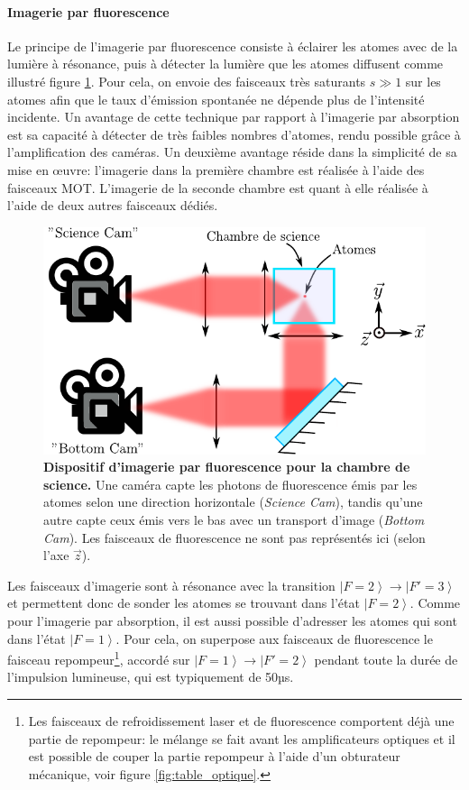 \paragraph*{Imagerie par fluorescence}
Le principe de l'imagerie par fluorescence consiste à éclairer les atomes avec de la lumière à résonance, puis à détecter la lumière que les atomes diffusent comme illustré figure \ref{fig:img_science}. Pour cela, on envoie des faisceaux très saturants $s \gg 1$ sur les atomes afin que le taux d'émission spontanée ne dépende plus de l'intensité incidente. Un avantage de cette technique par rapport à l'imagerie par absorption est sa capacité à détecter de très faibles nombres d'atomes, rendu possible grâce à l'amplification des caméras. Un deuxième avantage réside dans la simplicité de sa mise en œuvre: l'imagerie dans la première chambre est réalisée à l'aide des faisceaux MOT. L'imagerie de la seconde chambre est quant à elle réalisée à l'aide de deux autres faisceaux dédiés.
\begin{figure}
\centering
\includegraphics[scale=1]{fig/BEC_manip/img_science_3.pdf}
\caption{\textbf{Dispositif d'imagerie par fluorescence pour la chambre de science.} Une caméra capte les photons de fluorescence émis par les atomes selon une direction horizontale (\emph{Science Cam}), tandis qu'une autre capte ceux émis vers le bas avec un transport d'image (\emph{Bottom Cam}). Les faisceaux de fluorescence ne sont pas représentés ici (selon l'axe $\vec{z}$).}
\label{fig:img_science}
\end{figure}
Les faisceaux d'imagerie sont à résonance avec la transition $\left| F=2 \right\rangle \rightarrow \left| F'=3 \right\rangle$ et permettent donc de sonder les atomes se trouvant dans l'état $\left| F=2 \right\rangle$. Comme pour l'imagerie par absorption, il est aussi possible d'adresser les atomes qui sont dans l'état $\left| F=1 \right\rangle$. Pour cela, on superpose aux faisceaux de fluorescence le faisceau repompeur\footnote{Les faisceaux de refroidissement laser et de fluorescence comportent déjà une partie de repompeur: le mélange se fait avant les amplificateurs optiques et il est possible de couper la partie repompeur à l'aide d'un obturateur mécanique, voir figure \ref{fig:table_optique}.}, accordé sur $\left| F=1 \right\rangle \rightarrow \left| F'=2 \right\rangle$ pendant toute la durée de l'impulsion lumineuse, qui est typiquement de 50µs. \\
